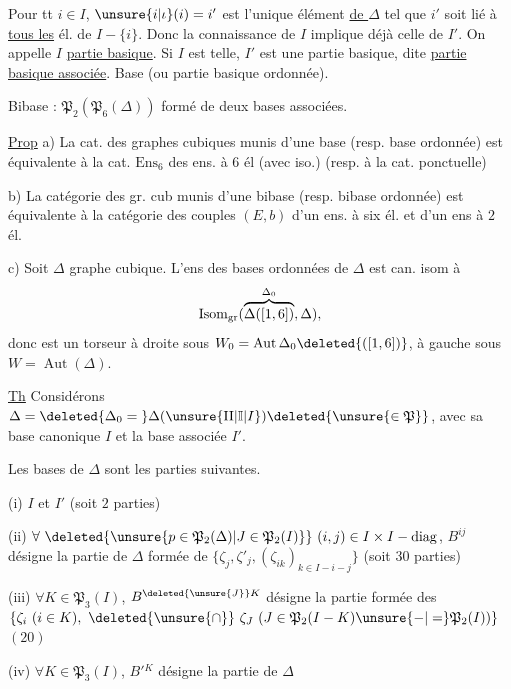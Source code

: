Pour tt $i\in I$, $\unsure{i|\iota}(i)=i'$ est l'unique élément \uline{de $\Delta$} tel que $i'$ soit lié à \uline{tous les} él. de $I-\{i\}$. Donc la connaissance de $I$ implique déjà celle de $I'$. On appelle $I$ \uline{partie basique}. Si $I$ est telle, $I'$ est une partie basique, dite \uline{partie basique associée}. Base (ou partie basique ordonnée).


Bibase :   $\mathfrak P_2(\mathfrak P_6(\Delta))$ formé de deux  bases associées.

\uline{Prop} a) La cat.  des graphes cubiques munis d'une base (resp. base ordonnée) est équivalente  à la cat. $\mathrm{Ens}_6$ des ens. à $6$ él (avec iso.) (resp. à la cat. ponctuelle)

b) La catégorie des gr. cub munis d'une bibase (resp. bibase ordonnée) est  équivalente à la catégorie  des couples $(E,b)$ d'un ens. à six él. et d'un ens à $2$ él.

c) Soit $\Delta$ graphe cubique. L'ens des bases ordonnées de $\Delta$ est can. isom à
\[
\operatorname{Isom}_{\rm gr}(\overbrace{\Delta([1,6])}^{\Delta_0},\Delta),
\]
donc est un torseur à droite sous $W_0=\operatorname{Aut}\Delta_0\deleted{([1,6])}$, à gauche sous $W=\operatorname{Aut}(\Delta)$.

\uline{Th} Considérons $\Delta=\deleted{\Delta_0={}}\Delta(\unsure{\mathrm{II}|\mathbb I|I})\deleted{\unsure{\in\mathfrak P}}$,   avec sa base canonique  $I$ et la base associée $I'$.

Les bases de $\Delta$ sont les parties  suivantes.

(i) $I$ et $I'$ \deleted{\unsure{:}} (soit $2$ parties)

(ii) $\forall\ \deleted{\unsure{p\in\mathfrak P_2(\Delta)|J\in\mathfrak P_2(I)}}\ (i,j)\in I\times I-\operatorname{diag}$, $B^{ij}$ désigne la partie de $\Delta$ formée de $\{\zeta_j,\zeta'_j,(\zeta_{ik})_{k\in I-i-j}\}$ (soit $30$ parties)

(iii) $\forall K\in\mathfrak P_3(I)$, $B^{\deleted{\unsure{J}}K}$ désigne la partie  formée des $\{\zeta_i\ (i\in K),\ \deleted{\unsure{\cap}}\ \zeta_J\ (J\in\mathfrak P_2(I-K)\unsure{-|=}\mathfrak P_2(I))\}$ $(20)$

(iv) $\forall K\in\mathfrak P_3(I)$, $B'{}^K$ désigne la partie de $\Delta$
